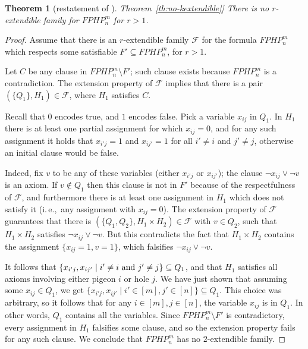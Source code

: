 \documentclass[11pt]{article}
\numberwithin{equation}{section}
\newtheorem{theorem}{Theorem}[section]
\theoremstyle{definition}
\theoremstyle{plain}
\newcommand{\ie}{i.\,e.}
\newcommand{\expref}[2]{\hyperref[#2]{#1~\ref{#2}}}
\theoremstyle{plain}
\theoremstyle{definition}
\newcommand{\set}[1]{\{ #1 \}}
\newcommand{\setdescr}[3][\mid]{\set{ #2 #1 #3 }}
\newcommand{\ieComma}{\ie,\ }
\newcommand{\formulaformat}[1]{\mathit{#1}}
\newcommand{\fphpnot}[2]{\formulaformat{FPHP}^{#1}_{#2}}
\newcommand{\kextendiblenot}{r}
\newcommand{\kextendible}{\mbox{$\kextendiblenot$-ex}\-tend\-ible\xspace}
\newcommand{\akextendible}{an \mbox{$\kextendiblenot$-ex}\-tend\-ible\xspace}
\newcommand{\kextendfamily}{\ensuremath{\mathcal{F}}\xspace}
\newcommand{\respectfulness}{respectfulness\xspace}
\newcommand{\extensionproperty}{extension property\xspace}
\begin{document}
\begin{theorem}[restatement of \expref{Theorem}{th:no-kextendible}]
  There is no \kextendible family for $\fphpnot{m}{n}$ for $\kextendiblenot > 1$.
\end{theorem}
\begin{proof}

  Assume that there is \akextendible family $\kextendfamily$ for
  the formula $\fphpnot{m}{n}$ which respects some satisfiable
  $F'\subseteq \fphpnot{m}{n}$, for $\kextendiblenot>1$.

  Let $C$ be any clause in $\fphpnot{m}{n}\setminus F'$; such clause exists because $\fphpnot{m}{n}$ is a contradiction.
  The \extensionproperty of \kextendfamily implies that there is a
  pair $(\{Q_{1}\}, H_{1} )\in\kextendfamily$, where $H_{1}$ satisfies $C$.

  Recall that $0$ encodes true, and $1$ encodes false. Pick a
  variable $x_{ij}$ in $Q_{1}$. In $H_{1}$ there is at least one
  partial assignment for which $x_{ij}=0$, and for any such assignment
  it holds that $x_{i'j}=1$ and $x_{ij'}=1$ for all $i'\not=i$ and
  $j'\not=j$, otherwise an initial clause would be false.

  Indeed, fix $v$ to be any of these variables (either $x_{i'j}$ or
  $x_{ij'}$); the clause $\lnot{x_{ij}} \lor \lnot{v}$ is an axiom.
  If $v \not\in Q_{1}$ then this clause is not in $F'$ because of the
  \respectfulness of \kextendfamily, and furthermore there is at
  least one assignment in $H_{1}$ which does not satisfy it (\ieComma any assignment with
  $x_{ij}=0$).
  The \extensionproperty of \kextendfamily guarantees that there is
  $(\{Q_{1},Q_{2}\},H_{1}\times H_{2}) \in \kextendfamily$ with $v\in
  Q_{2}$, such that $H_{1}\times H_{2}$ satisfies $\lnot{x_{ij}} \lor
  \lnot{v}$. But this contradicts the fact that $H_{1}\times H_{2}$
  contains the assignment $\{x_{ij}=1,v=1\}$, which falsifies
  $\lnot{x_{ij}} \lor \lnot{v}$.


  It follows that $\setdescr{x_{i'j},x_{ij'}}{i'\not=i \text{\ and\
    } j'\not=j} \subseteq Q_{1}$, and that $H_{1}$ satisfies all
  axioms involving either pigeon $i$ or hole $j$.
  We have just shown that assuming some $x_{ij}\in Q_{1}$, we get
  \mbox{$\setdescr{x_{i'j},x_{ij'}}{i'\in[m], j'\in[n]}\subseteq
    Q_{1}$}. This choice was arbitrary, so it follows that for any
  $i\in[m], j\in[n]$, the variable $x_{ij}$ is in $Q_{1}$. In other
  words, $Q_1$ contains all the variables. Since
  $\fphpnot{m}{n}\setminus F'$ is contradictory, every assignment in
  $H_1$ falsifies some clause, and so the \extensionproperty fails for
  any such clause.  We conclude that $\fphpnot{m}{n}$ has no
  $2$-extendible family.
  \end{proof}
\end{document}
